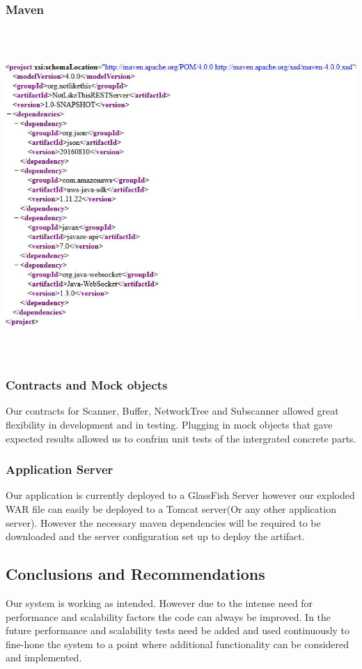 \documentclass[hidelinks,a4paper,12pt]{article}
\begin{document}
\subsubsection{Maven}
\includegraphics[width=17.3cm,height=12.5cm]{./images/maven.jpg}
\subsubsection{Contracts and Mock objects}
Our contracts for  Scanner, Buffer, NetworkTree and Subscanner allowed great flexibility  in development and in testing. Plugging in mock objects that gave expected results allowed us to confrim unit tests of the intergrated concrete parts.
\subsubsection{Application Server}
Our application is currently deployed to a GlassFish Server however our exploded WAR file can easily be deployed to a Tomcat server(Or any other application server). However the necessary maven dependencies will be required to be downloaded and the server configuration set up to deploy the artifact.

\subsection{Conclusions and Recommendations}
Our system is working as intended. However due to the intense need for performance and scalability factors the code can always be improved. In the future performance and scalability tests need be added and used continuously to fine-hone the system to a point where additional functionality can be considered and implemented. 
\end{document}
